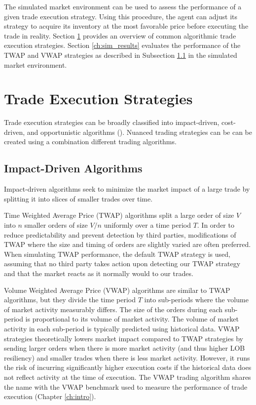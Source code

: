 The simulated market environment can be used to assess the performance of a given trade execution strategy. Using this procedure, the agent can adjust its strategy to acquire its inventory at the most favorable price before executing the trade in reality. Section \ref{ch:strategies} provides an overview of common algorithmic trade execution strategies. Section \ref{ch:sim_results} evaluates the performance of the TWAP and VWAP strategies as described in Subsection \ref{ch:impact-driven} in the simulated market environment.

\section{Trade Execution Strategies} \label{ch:strategies}
Trade execution strategies can be broadly classified into impact-driven, cost-driven, and opportunistic algorithms (\cite{labadie:hal-00590283}). Nuanced trading strategies can be can be created using a combination different trading algorithms.

\subsection{Impact-Driven Algorithms} \label{ch:impact-driven}
Impact-driven algorithms seek to minimize the market impact of a large trade by splitting it into slices of smaller trades over time. 

Time Weighted Average Price (TWAP) algorithms split a large order of size $V$ into $n$ smaller orders of size $V/n$ uniformly over a time period $T$. In order to reduce predictability and prevent detection by third parties, modifications of TWAP where the size and timing of orders are slightly varied are often preferred. When simulating TWAP performance, the default TWAP strategy is used, assuming that no third party takes action upon detecting our TWAP strategy and that the market reacts as it normally would to our trades.

Volume Weighted Average Price (VWAP) algorithms are similar to TWAP algorithms, but they divide the time period $T$ into sub-periods where the volume of market activity measurably differs. The size of the orders during each sub-period is proportional to its volume of market activity. The volume of market activity in each sub-period is typically predicted using historical data. VWAP strategies theoretically lowers market impact compared to TWAP strategies by sending larger orders when there is more market activity (and thus higher LOB resiliency) and smaller trades when there is less market activity. However, it runs the risk of incurring significantly higher execution costs if the historical data does not reflect activity at the time of execution. The VWAP trading algorithm shares the name with the VWAP benchmark used to measure the performance of trade execution (Chapter \ref{ch:intro}).

